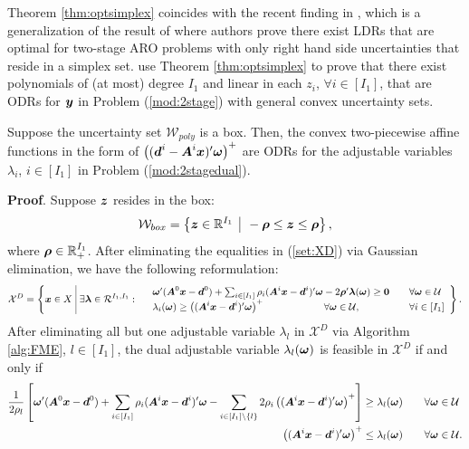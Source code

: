 \documentclass[fleqn,mnsc,blindrev]{informs4}
\newcommand{\mb}[1]{\mbox{\boldmath \ensuremath{#1}}}
\begin{document}
	 {Theorem \ref{thm:optsimplex} coincides with the recent finding in \cite[Corollary 2]{bwoz16}}, which is a generalization of the result of \cite[Theorem 1]{bg12} where authors prove there exist  LDRs that are optimal for two-stage ARO problems with only right hand side uncertainties that reside in a simplex set.  {\cite{zd17b} use Theorem \ref{thm:optsimplex} to prove that there exist polynomials of (at most) degree $I_1$ and linear in each $z_i$, $\forall i \in [I_1]$, that are ODRs for $\mb{y}$ in Problem (\ref{mod:2stage}) with general convex uncertainty sets.}
	
	
	\begin{theorem} \label{thm:optbox}
		Suppose the uncertainty set $\mathcal{W}_{poly}$ is a box. Then, the convex two-piecewise affine functions in the form of $\left((\mb{d}^i- \mb{A}^i\mb{x})'\mb{\omega}\right)^+$ are ODRs for the adjustable variables $\lambda_i$, $i\in [I_1]$ in Problem (\ref{mod:2stagedual}).
	\end{theorem}
	\textbf{Proof}. Suppose $\mb{z}$ resides in the box:
\begin{equation*}
	\mathcal{W}_{box} = \left\{ \mb{z}\in \mathbb{R}^{I_1} \enskip \vline  \enskip -\mb{\rho} \le \mb{z} \le \mb{\rho} \right\},  
\end{equation*}
	where $\mb{\rho} \in \mathbb{R}^{I_1}_{+}$.  After eliminating the equalities in (\ref{set:XD}) via Gaussian elimination, we have the following reformulation:
\begin{equation}\label{set:Xbox}
		\mathcal{X}^D=  \left\{ \mb{x} \in X \,\, \vline \,\,
		\exists \mb{\lambda} \in \mathcal{R}^{I_1,I_1}: \begin{array}{lll}
			&  \mb{\omega}' (\mb{A}^0\mb{x}-\mb{d}^0) + \sum_{i\in [I_1]} \rho_i (\mb{A}^i\mb{x}-\mb{d}^i)'\mb{\omega}- 2\mb{\rho}'\mb{\lambda}(\mb{\omega}) \ge \mb{0}  \quad & \forall \mb{\omega} \in \mathcal{U} \\
			&\lambda_i(\mb{\omega}) \ge \left((\mb{A}^i\mb{x}- \mb{d}^i)'\mb{\omega}\right)^+   \qquad   \qquad  \qquad \forall \mb{\omega} \in \mathcal{U},  \enskip &\forall i\in [I_1] 
		\end{array}
		\right\}.
\end{equation}
	After eliminating all but one adjustable variable $\lambda_l$ in $\mathcal{X}^D$ via Algorithm \ref{alg:FME}, $l \in [I_1]$,  the dual adjustable variable $\lambda_l(\mb{\omega})$ is feasible in $\mathcal{X}^D$ if and only if 
\begin{align*}
		 \frac{1}{2\rho_l} \left[\mb{\omega}' (\mb{A}^0\mb{x}-\mb{d}^0) + \sum_{i\in [I_1]} \rho_i (\mb{A}^i\mb{x}-\mb{d}^i )'\mb{\omega} - \sum_{i \in [I_1]\setminus\{l\}}  2\rho_i\left((\mb{A}^i\mb{x}- \mb{d}^i)'\mb{\omega}\right)^+ \right] &\ge  \lambda_l(\mb{\omega}) \qquad  \forall \mb{\omega} \in \mathcal{U}\\
		   \left((\mb{A}^i\mb{x}- \mb{d}^i)'\mb{\omega}\right)^+ &\le \lambda_l(\mb{\omega}) \qquad  \forall \mb{\omega} \in \mathcal{U}.
\end{align*}
\end{document}
